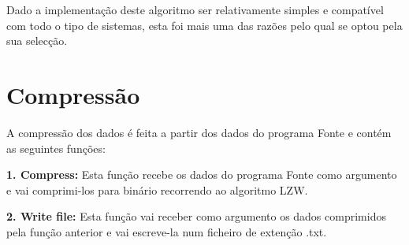 \documentclass{article}
\begin{document}
\begin{titlepage}
    \vspace{1cm}\indent Dado a implementação deste algoritmo ser relativamente simples e compatível com todo o tipo de sistemas, esta foi mais uma das razões pelo qual se optou pela sua selecção.
\clearpage
\section{Compressão}
    A compressão dos dados é feita a partir dos dados do programa Fonte e contém as seguintes funções:
    \vspace{0.5cm}
    
    \indent\textbf{1. Compress:}
    Esta função recebe os dados do programa Fonte como argumento e vai comprimi-los para binário recorrendo ao algoritmo LZW.
    \vspace{0.5cm}
    
   \indent\textbf{2. Write file:}
    Esta função vai receber como argumento os dados comprimidos pela função anterior e vai escreve-la num ficheiro de extenção .txt.
    \vspace{0.5cm}
    
    \begin{figure}[!ht]
        \flushleft
\end{figure}
\end{titlepage}
\end{document}
